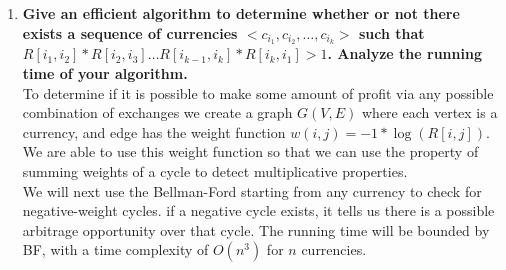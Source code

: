 \documentclass{article}
\begin{document}
\begin{enumerate}




\begin{enumerate}

\item \textbf{ Give an efficient algorithm to determine whether or not there exists a sequence of currencies $<c_{i_1}, c_{i_2}, \dots, c_{i_k}>$ such that $R[i_1, i_2] * R[i_2, i_3] \dots R[i_{k-1}, i_k] * R[i_k, i_1] > 1$. Analyze the running time of your algorithm. } \\

To determine if it is possible to make some amount of profit via any possible combination of exchanges we create a graph $G(V,E)$ where each vertex is a currency, and edge has the weight function $w(i,j) = -1 * \log(R[i,j])$. We are able to use this weight function so that we can use the property of summing weights of a cycle to detect multiplicative properties. \\
\newline 
We will next use the Bellman-Ford starting from any currency to check for negative-weight cycles. if a negative cycle exists, it tells us there is a possible arbitrage opportunity over that cycle. The running time will be bounded by BF, with a time complexity of $O(n^3)$ for $n$ currencies. \\










\end{enumerate}
\end{enumerate}
\end{document}
